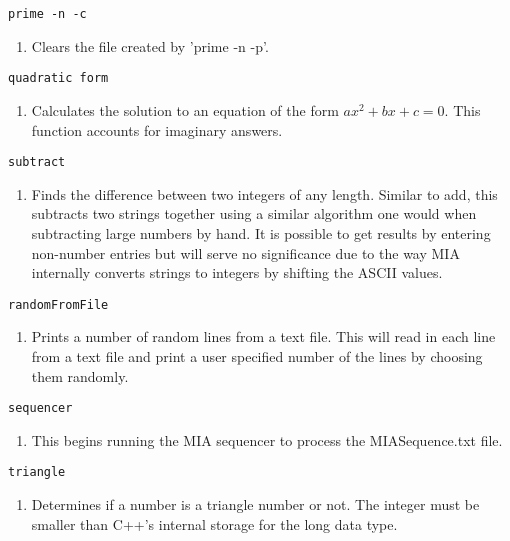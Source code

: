 \begin{lstlisting} 
prime -n -c   
\end{lstlisting}
\begin{enumerate}
	\item[] Clears the file created by 'prime -n -p'.
\end{enumerate}

\begin{lstlisting} 
quadratic form
\end{lstlisting}
\begin{enumerate}
	\item[] Calculates the solution to an equation of the form $ax^2+bx+c=0$. This function accounts for imaginary answers.
\end{enumerate}

\begin{lstlisting} 
subtract   
\end{lstlisting}
\begin{enumerate}
	\item[] Finds the difference between two integers of any length. Similar to add, this subtracts two strings together using a similar algorithm one would when subtracting large numbers by hand. It is possible to get results by entering non-number entries but will serve no significance due to the way MIA internally converts strings to integers by shifting the ASCII values.
\end{enumerate}

\begin{lstlisting} 
randomFromFile
\end{lstlisting}
\begin{enumerate}
	\item[]  Prints a number of random lines from a text file. This will read in each line from a text file and print a user specified number of the lines by choosing them randomly.
\end{enumerate}

\begin{lstlisting} 
sequencer
\end{lstlisting}
\begin{enumerate}
	\item[] This begins running the MIA sequencer to process the MIASequence.txt file. 
\end{enumerate}

\begin{lstlisting} 
triangle   
\end{lstlisting}
\begin{enumerate}
	\item[] Determines if a number is a triangle number or not. The integer must be smaller than C++'s internal storage for the long data type.
\end{enumerate}

